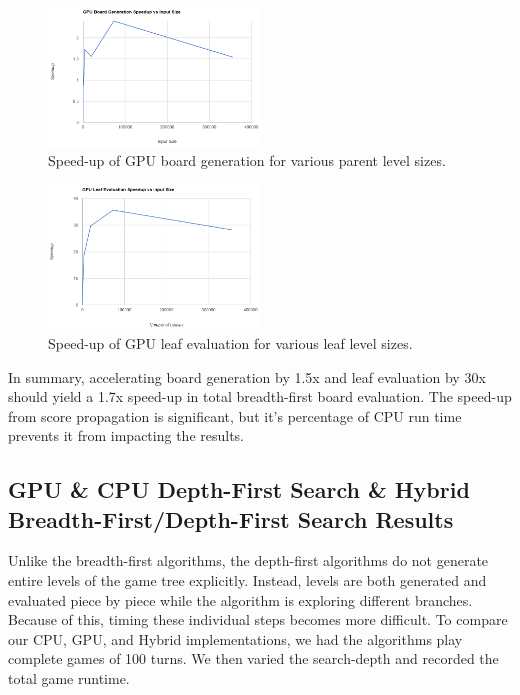 \documentclass[11pt]{article}
\begin{document}
\begin{figure}[ht]
  \centering
    \includegraphics[width=0.5\textwidth]{pictures/bfs_board_gen_speedup.png}
  \caption
  {
    Speed-up of GPU board generation for various parent level sizes.
    \label{fig:bfsboardgenspeed-up}
  }

\end{figure}


\begin{figure}[ht]
  \centering
    \includegraphics[width=0.5\textwidth]{pictures/bfs_leaf_eval_speedup.png}
  \caption
  {
    Speed-up of GPU leaf evaluation for various leaf level sizes.
    \label{fig:bfsleafevalspeed-up}
  }
\end{figure}

In summary, accelerating board generation by 1.5x and leaf evaluation by 30x
should yield a 1.7x speed-up in total breadth-first board evaluation. The speed-up from 
score propagation is significant, but it's percentage of CPU run time prevents
it from impacting the results.

\newpage
\subsection{GPU \& CPU Depth-First Search \& Hybrid Breadth-First/Depth-First Search Results}

Unlike the breadth-first algorithms, the depth-first algorithms do not generate entire levels
of the game tree explicitly. Instead, levels are both
generated and evaluated piece by piece while the algorithm is exploring
different branches. Because of this, timing these individual steps becomes more
difficult. To compare our CPU, GPU, and Hybrid implementations, we had the algorithms
play complete games of 100 turns. We then varied the search-depth and recorded the total game runtime.
\end{document}
